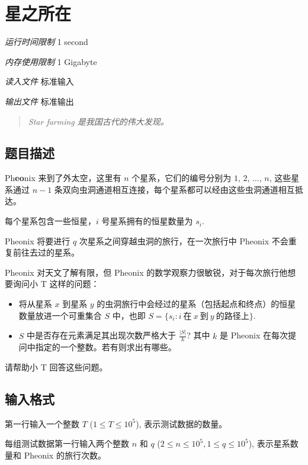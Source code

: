 \section[C. 星之所在]{ 星之所在}

\textit{运行时间限制}   1 second

\textit{内存使用限制} 1 Gigabyte

\textit{读入文件} \qquad 标准输入

\textit{输出文件} \qquad 标准输出


\begin{quote}
	\textit{Star farming 是我国古代的伟大发现。}
\end{quote}

\subsection{题目描述}

Ph\textbf{eo}nix 来到了外太空，这里有 $n$ 个星系，它们的编号分别为 $1$, $2$, $\ldots$, $n$, 这些星系通过 $n - 1$ 条双向虫洞通道相互连接，每个星系都可以经由这些虫洞通道相互抵达。

每个星系包含一些恒星，$i$ 号星系拥有的恒星数量为 $s_i$.

Pheonix 将要进行 $q$ 次星系之间穿越虫洞的旅行，在一次旅行中 Pheonix 不会重复前往去过的星系。


Pheonix 对天文了解有限，但 Pheonix 的数学观察力很敏锐，对于每次旅行他想要询问小 T 这样的问题：

\begin{itemize}
	\item 将从星系 $x$ 到星系 $y$ 的虫洞旅行中会经过的星系（包括起点和终点）的恒星数量放进一个可重集合 $S$ 中，也即 $S = \{s_i : i\ \text{在} \ x \ \text{到}\  y\ \text{的路径上}\}$.
	\item $S$ 中是否存在元素满足其出现次数严格大于 $\frac{|S|}{k}$? 其中 $k$ 是 Pheonix 在每次提问中指定的一个整数。若有则求出有哪些。
\end{itemize}

请帮助小 T 回答这些问题。

\subsection{输入格式}

第一行输入一个整数 $T$ ($ 1 \le T \le 10^5$), 表示测试数据的数量。

每组测试数据第一行输入两个整数 $n$ 和 $q$ ($2 \le n \le 10^5, 1 \le q \le 10^5$), 表示星系数量和 Pheonix 的旅行次数。

